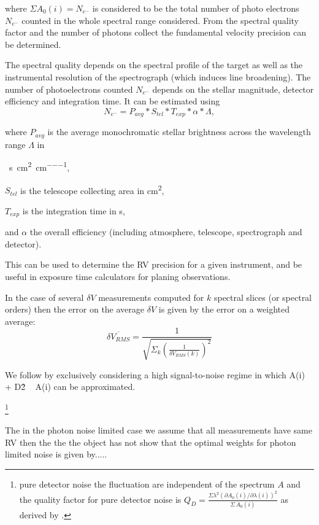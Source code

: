where \(\Sigma A_0(i) = {N}_{{e}^{-}}\) is considered to be the total number of photo electrons \({N}_{{e}^{-}}\) counted in the whole spectral range considered.
From the spectral quality factor and the number of photons collect the fundamental velocity precision can be determined.

The spectral quality depends on the spectral profile of the target as well as the instrumental resolution of the spectrograph (which induces line broadening). The number of photoelectrons counted  \(N_{e^{-}}\) depends on the stellar magnitude, detector efficiency and integration time. It can be estimated using 
 \begin{equation}
 N_{e^{-}} = P_{avg} * S_{tel} * T_{exp} * \alpha* \Lambda, 
 \end{equation}
 
where \(P_{avg}\) is the average monochromatic stellar brightness 
across the wavelength range \(\Lambda\) in

\si{\photons\per\second\per\centi\metre\squared\per\centi\metre},

\(S_{tel}\) is the telescope collecting area in \si{\centi\metre\squared}, 

\(T_{exp}\) is the integration time in \si{\second}, 

and \(\alpha\) the overall efficiency (including atmosphere, telescope, spectrograph and detector). 

 This can be used to determine the RV precision for a given instrument, and be useful in exposure time calculators for planing observations. 

In the case of several \(\delta  V\) measurements computed for \(k\) spectral slices (or spectral orders) then the error on the average \(\delta V\) is given by the error on a weighted average:
\begin{equation}
\overline{\delta {V}_{RMS}} = \frac{1}{\sqrt{\Sigma_k{(\frac{1}{\delta V_{RMS}(k)})^2}}}
\end{equation}


We follow \cite{figueira_radial_2016} by exclusively considering  a high signal-to-noise regime in which A(i) + D\^2 ~ A(i) can be approximated.


\footnote{ pure detector noise the fluctuation are independent of the spectrum \(A\) and the quality factor for pure detector noise is \(Q_D = \frac{\Sigma{\lambda^2 {(\partial A_0(i)/\partial \lambda(i))}^{2}}}{\Sigma{\, A_0(i)}}\) as derived by \cite{Connes1985}. }

The in the photon noise limited case we assume that all measurements have same RV then the the the object has not 
\citet{Connes1985} show that the optimal weights for photon limited noise is given by.....


